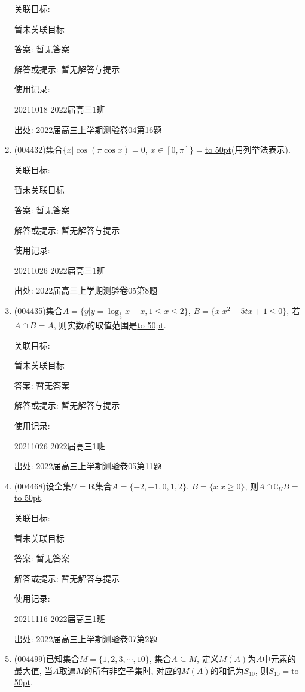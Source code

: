 \documentclass[10pt,a4paper]{article}
\newcommand{\blank}[1]{\underline{\hbox to #1pt{}}}
\begin{document}
\begin{enumerate}[1.]
关联目标:

暂未关联目标

答案: 暂无答案

解答或提示: 暂无解答与提示

使用记录:

20211018	2022届高三1班			


出处: 2022届高三上学期测验卷04第16题
\item { (004432)}集合$\{x|\cos(\pi \cos x)=0,\ x\in [0,\pi]\}=$\blank{50}(用列举法表示).


关联目标:

暂未关联目标

答案: 暂无答案

解答或提示: 暂无解答与提示

使用记录:

20211026	2022届高三1班	


出处: 2022届高三上学期测验卷05第8题
\item { (004435)}集合$A=\{y|y=\log_{\frac 12}x-x,1\le x\le 2\}$, $B=\{x|x^2-5tx+1\le 0\}$, 若$A\cap B=A$, 则实数$t$的取值范围是\blank{50}.


关联目标:

暂未关联目标

答案: 暂无答案

解答或提示: 暂无解答与提示

使用记录:

20211026	2022届高三1班	


出处: 2022届高三上学期测验卷05第11题
\item { (004468)}设全集$U=\mathbf{R}$集合$A=\{-2,-1,0,1,2\}$, $B=\{x|x\ge 0\}$, 则$A\cap \complement_UB=$\blank{50}.


关联目标:

暂未关联目标

答案: 暂无答案

解答或提示: 暂无解答与提示

使用记录:

20211116	2022届高三1班	


出处: 2022届高三上学期测验卷07第2题
\item { (004499)}已知集合$M=\{1,2,3,\cdots,10\}$, 集合$A\subseteq M$, 定义$M(A)$为$A$中元素的最大值, 当$A$取遍$M$的所有非空子集时, 对应的$M(A)$的和记为$S_{10}$, 则$S_{10}=$\blank{50}.



\end{enumerate}
\end{document}
